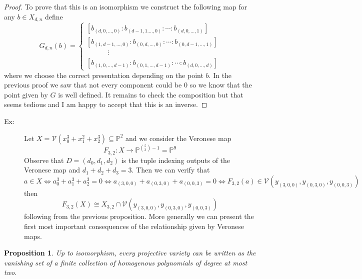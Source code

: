 \documentclass[40pt]{article}
\newcommand{\Proj}{\mathbb{P}}
\newcommand{\V}{\mathcal{V}}
\newtheorem{proposition}{Proposition}[section]
\theoremstyle{remark}
\begin{document}
		\begin{proof}
			To prove that this is an isomorphism we construct the following map for any $b \in X_{d,n}$ define
			\[
			G_{d,n}(b) = \begin{cases}
				[b_{(d,0,\dots,0)} : b_{(d-1,1.\dots,0)}  :\cdots : b_{(d,0,\dots,1)}] \\
				[b_{(1,d-1,\dots,0)} : b_{(0,d,\dots,0)} :\cdots : b_{(0,d-1,\dots,1)} ] \\
				\quad\quad\quad\vdots \\
				[b_{(1,0,\dots,d-1)}: b_{(0,1,\dots,d-1)} : \cdots : b_{(d,0,\dots,d)} ]
			\end{cases}
			\]
			where we choose the correct presentation depending on the point $b$. In the previous proof we saw that not every component could be 0 so we know that the point given by $G$ is well defined. It remains to check the composition but that seems tedious and I am happy to accept that this is an inverse.
		\end{proof}
			\begin{description}
				\item[Ex:] Let $X = \V(x_0^3 + x_1^2 + x_2^3) \subseteq \Proj^2$ and we consider the Veronese map 
				\[
				F_{3,2} : X \rightarrow \Proj^{{5 \choose 3} - 1} = \Proj^9
				\]
				Observe that $D = (d_0,d_1,d_2)$ is the tuple indexing outputs of the Veronese map and $d_1 + d_2 + d_3 = 3$. Then we can verify that 
				\[a \in X \iff a_0^3 + a_1^3 + a_2^3 = 0 \iff a_{(3,0,0)} + a_{(0,3,0)} + a_{(0,0,3)} = 0 \iff F_{3,2}(a) \in \V(y_{(3,0,0)}, y_{(0,3,0)}, y_{(0,0,3)})\]
				then
				\[
				F_{3,2}(X) \cong X_{3,2} \cap \V(y_{(3,0,0)}, y_{(0,3,0)}, y_{(0,0,3)})
				\]
				following from the previous proposition. More generally we can present the first most important consequences of the relationship given by Veronese maps.
				
			\end{description}
			\begin{proposition}
				Up to isomorphism, every projective variety can be written as the vanishing set of a finite collection of homogenous polynomials of degree at most two.
			\end{proposition}
\end{document}
